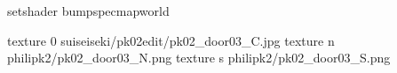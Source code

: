 setshader bumpspecmapworld

texture 0 suiseiseki/pk02edit/pk02_door03_C.jpg
texture n philipk2/pk02_door03_N.png
texture s philipk2/pk02_door03_S.png

